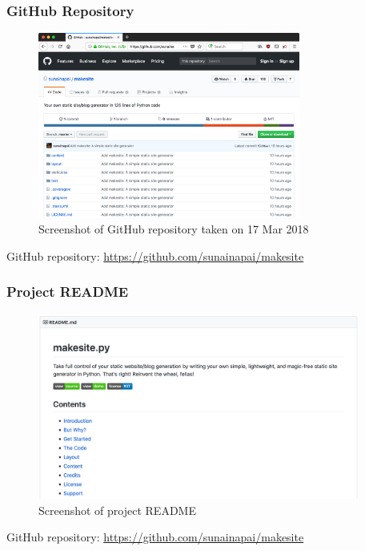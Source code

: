 \documentclass{beamer}
\newcommand{\linkcaption}[1]{
    \centering \scriptsize #1
}
\begin{document}
\begin{frame}
    \frametitle{GitHub Repository}

    \begin{figure}
        \centering
        \includegraphics[height=2.4in]{makesite-github.png}
        \caption{Screenshot of GitHub repository taken on 17 Mar 2018}
    \end{figure}

    \linkcaption{
        GitHub repository: \url{https://github.com/sunainapai/makesite}
    }
\end{frame}


\begin{frame}
    \frametitle{Project README}

    \begin{figure}
        \centering
        \includegraphics[height=2.4in]{makesite-readme.png}
        \caption{Screenshot of project README}
    \end{figure}

    \linkcaption{
        GitHub repository: \url{https://github.com/sunainapai/makesite}
    }
\end{frame}
\end{document}
